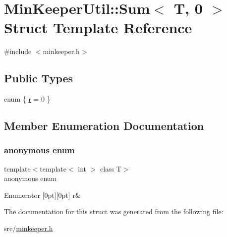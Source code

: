 \hypertarget{structMinKeeperUtil_1_1Sum_3_01T_00_010_01_4}{}\section{Min\+Keeper\+Util\+:\+:Sum$<$ T, 0 $>$ Struct Template Reference}
\label{structMinKeeperUtil_1_1Sum_3_01T_00_010_01_4}


{\ttfamily \#include $<$minkeeper.\+h$>$}

\subsection*{Public Types}
\begin{DoxyCompactItemize}
\item 
enum \{ \hyperlink{structMinKeeperUtil_1_1Sum_3_01T_00_010_01_4_a5b2093fddc1c5a07474a4b05727797cfa1a458b2b5354a0cefde69d7427d39eb0}{r} = 0
 \}
\end{DoxyCompactItemize}


\subsection{Member Enumeration Documentation}
\mbox{\label{structMinKeeperUtil_1_1Sum_3_01T_00_010_01_4_a5b2093fddc1c5a07474a4b05727797cf}} 
\subsubsection{\texorpdfstring{anonymous enum}{anonymous enum}}
{\footnotesize\ttfamily template$<$template$<$ int $>$ class T$>$ \\
anonymous enum}

\begin{DoxyEnumFields}{Enumerator}
[0pt][0pt]{}\mbox{\label{structMinKeeperUtil_1_1Sum_3_01T_00_010_01_4_a5b2093fddc1c5a07474a4b05727797cfa1a458b2b5354a0cefde69d7427d39eb0}} 
r&\\
\hline

\end{DoxyEnumFields}


The documentation for this struct was generated from the following file\+:\begin{DoxyCompactItemize}
\item 
src/\hyperlink{minkeeper_8h}{minkeeper.\+h}\end{DoxyCompactItemize}
